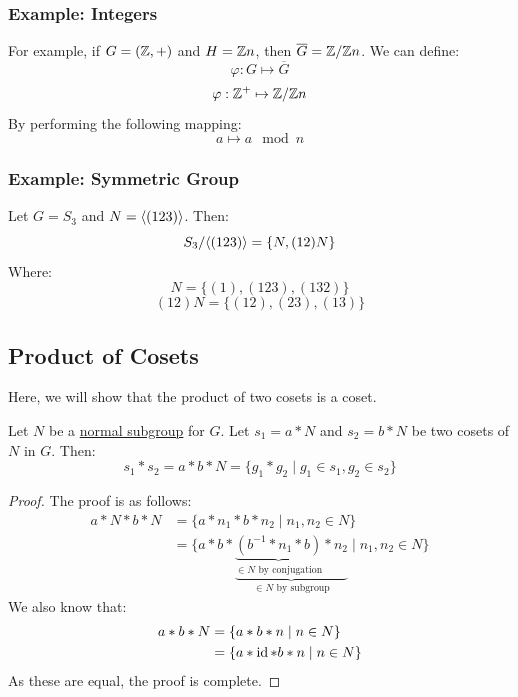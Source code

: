 \documentclass[letterpaper]{article}
\begin{document}
\subsubsection{Example: Integers}
For example, if $G = (\mathbb{Z}, +)$ and $H = \mathbb{Z} n$, then $\overline{G} = \mathbb{Z} / \mathbb{Z} n$. We can define: 
\[\varphi: G \mapsto \overline{G}\]
\[\varphi: \mathbb{Z}^+ \mapsto \mathbb{Z} / \mathbb{Z} n\]
By performing the following mapping: 
\[a \mapsto a \mod{n}\]

\subsubsection{Example: Symmetric Group}
Let $G = S_3$ and $N = \langle (123) \rangle$. Then: 
\[S_3 / \langle (123) \rangle = \{N, (12)N\}\]
Where: 
\[N = \{(1), (123), (132)\}\]
\[(12)N = \{(12), (23), (13)\}\]


\subsection{Product of Cosets}
Here, we will show that the product of two cosets is a coset. 
\begin{lemma}{}{}
    Let $N$ be a \underline{normal subgroup} for $G$. Let $s_1 = a * N$ and $s_2 = b * N$ be two cosets of $N$ in $G$. Then: 
    \[s_1 * s_2 = \boxed{a * b * N} = \{g_1 * g_2 \mid g_1 \in s_1, g_2 \in s_2\}\]
\end{lemma}

\begin{mdframed}
    \begin{proof}
        The proof is as follows: 
        \begin{equation*}
            \begin{aligned}
                a * N * b * N &= \{a * n_1 * b * n_2 \mid n_1, n_2 \in N\} \\
                    &= \{a * b * \underbrace{\underbrace{(b^{-1} * n_1 * b)}_{\in N \text{ by conjugation}} * n_2}_{\in N \text{ by subgroup}} \mid n_1, n_2 \in N\}
            \end{aligned}
        \end{equation*}
        We also know that: 
        \begin{equation*}
            \begin{aligned}
                a * b * N &= \{a * b * n \mid n \in N\} \\ 
                    &= \{a * \operatorname{id} * b * n \mid n \in N\}
            \end{aligned}
        \end{equation*}
        As these are equal, the proof is complete. 
    \end{proof}    
\end{mdframed}
\end{document}
